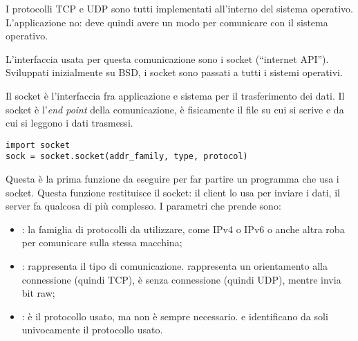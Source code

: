 I protocolli TCP e UDP sono tutti implementati all'interno del sistema operativo. L'applicazione no: deve quindi avere un modo per comunicare con il sistema operativo.

L'interfaccia usata per questa comunicazione sono i socket (``internet API''). Sviluppati inizialmente su BSD, i socket sono passati a tutti i sistemi operativi.

Il socket \`e l'interfaccia fra applicazione e sistema per il trasferimento dei dati. Il socket \`e l'\emph{end point} della comunicazione, \`e fisicamente il file su cui si scrive e da cui si leggono i dati trasmessi.

\begin{verbatim}
import socket
sock = socket.socket(addr_family, type, protocol)
\end{verbatim}

Questa \`e la prima funzione da eseguire per far partire un programma che usa i socket. Questa funzione restituisce il socket: il client lo usa per inviare i dati, il server fa qualcosa di pi\`u complesso. I parametri che prende sono:
\begin{itemize}
    \item {}: la famiglia di protocolli da utilizzare, come IPv4 o IPv6 o anche altra roba per comunicare sulla stessa macchina;
    \item {}: rappresenta il tipo di comunicazione.  rappresenta un orientamento alla connessione (quindi TCP),  \`e senza connessione (quindi UDP), mentre  invia bit raw;
    \item {}: \`e il protocollo usato, ma non \`e sempre necessario.  e  identificano da soli univocamente il protocollo usato.
\end{itemize}

